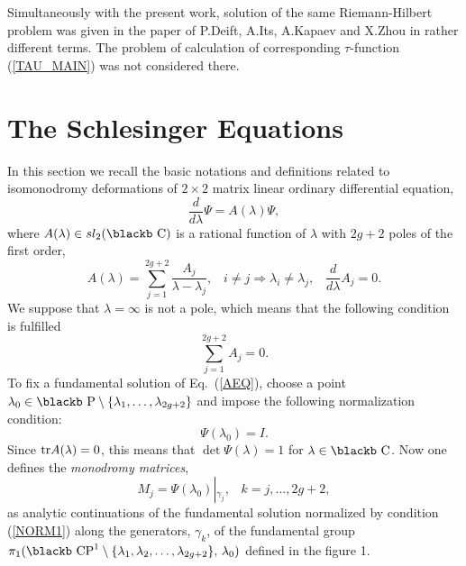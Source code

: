 \documentclass[11pt]{article}
\def\Bbb#1{\hbox{\blackb #1}}
\def\l{\lambda}
\def\tr{{\rm tr}}
\begin{document}
Simultaneously with the present work, solution of the same Riemann-Hilbert problem was given in the paper
of P.Deift, A.Its, A.Kapaev and X.Zhou \cite{DIKZ} in rather different terms. The problem of
calculation of corresponding $\tau$-function (\ref{TAU_MAIN}) was not considered there.

\section{The Schlesinger Equations}\label{SECTION2}
\setcounter{equation}{0}
In this section we recall the basic notations and definitions related to 
isomonodromy deformations of $2\times 2$ matrix linear ordinary 
differential equation,
\begin{equation}\label{AEQ}
\frac d{d\lambda}\Psi=A(\lambda)\Psi,
\end{equation} 
where $A(\lambda)\in sl_2(\Bbb C)$ is a rational function of $\lambda$
with $2g+2$ poles of the first order,
\begin{equation}\label{AKDEF}
A(\lambda)=\sum\limits_{j=1}^{2g+2}\frac{A_j}{\lambda-\lambda_j},\;\;\;
i\neq j\Rightarrow \lambda_i\neq\lambda_j,\;\;\;\frac d{d\lambda}A_j=0.
\end{equation}
We suppose that $\lambda=\infty$ is not a pole, which means that
the following condition is fulfilled
\begin{equation}
  \label{eq:INFTY_REGULAR}
  \sum\limits_{j=1}^{2g+2}A_j=0.
\end{equation}
To fix a fundamental solution of Eq.~(\ref{AEQ}), choose a point
$\lambda_0\in\Bbb P\setminus\{\lambda_1,\dots,\lambda_{2g+2}\}$ and impose
the following normalization condition:
\begin{equation}
  \label{NORM1}
\Psi(\lambda_0)=I.
\end{equation}
Since $\tr A(\l)=0$, this means that $\det\Psi(\lambda)=1$ 
for $\lambda\in\Bbb C$.
Now one defines the {\it monodromy matrices},
$$
M_j=\Psi(\lambda_0)\left\vert_{\gamma_j}\right.,\;\;\;
k=j,\dots, 2g+2,
$$ 
as analytic continuations of
the fundamental solution normalized by condition (\ref{NORM1}) along
the generators, $\gamma_k$, of the fundamental group
$\pi_1(\Bbb{CP}^1\setminus\{\lambda_1,\lambda_2,\dots,
\lambda_{2g+2}\},\,\lambda_0)$ defined in the figure 1.


\end{document}
